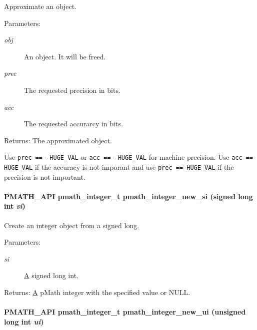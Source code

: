 Approximate an object. 

\begin{Desc}
\item[Parameters:]
\begin{description}
\item[{\em obj}]An object. It will be freed. \item[{\em prec}]The requested precision in bits. \item[{\em acc}]The requested accurarcy in bits. \end{description}
\end{Desc}
\begin{Desc}
\item[Returns:]The approximated object.\end{Desc}
Use {\tt prec == -HUGE\_\-VAL} or {\tt acc == -HUGE\_\-VAL} for machine precision. Use {\tt acc == HUGE\_\-VAL} if the accuracy is not imporant and use {\tt prec == HUGE\_\-VAL} if the precision is not important. \hypertarget{group__numbers_g34c4815ce444a7dd88a19335098c8c5b}{
\paragraph[{pmath\_\-integer\_\-new\_\-si}]{\setlength{\rightskip}{0pt plus 5cm}PMATH\_\-API {\bf pmath\_\-integer\_\-t} pmath\_\-integer\_\-new\_\-si (signed long int {\em si})}\hfill}
\label{group__numbers_g34c4815ce444a7dd88a19335098c8c5b}


Create an integer object from a signed long. 

\begin{Desc}
\item[Parameters:]
\begin{description}
\item[{\em si}]\hyperlink{class_a}{A} signed long int. \end{description}
\end{Desc}
\begin{Desc}
\item[Returns:]\hyperlink{class_a}{A} pMath integer with the specified value or NULL. \end{Desc}
\hypertarget{group__numbers_ga7704c11e6f72b8403db246f6862d4c6}{
\paragraph[{pmath\_\-integer\_\-new\_\-ui}]{\setlength{\rightskip}{0pt plus 5cm}PMATH\_\-API {\bf pmath\_\-integer\_\-t} pmath\_\-integer\_\-new\_\-ui (unsigned long int {\em ui})}\hfill}
\label{group__numbers_ga7704c11e6f72b8403db246f6862d4c6}


